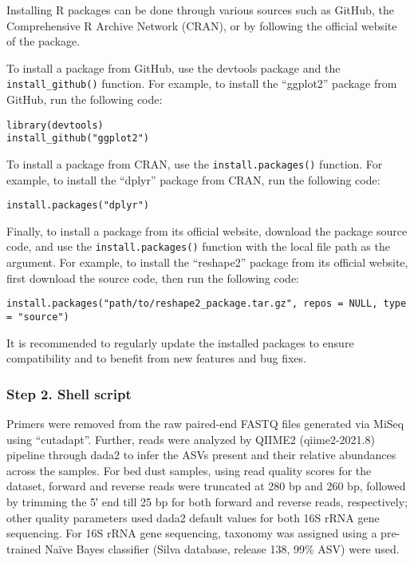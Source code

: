 \documentclass[
]{article}
\begin{document}
Installing R packages can be done through various sources such as
GitHub, the Comprehensive R Archive Network (CRAN), or by following the
official website of the package.

To install a package from GitHub, use the devtools package and the
\texttt{install\_github()} function. For example, to install the
``ggplot2'' package from GitHub, run the following code:

\begin{verbatim}
library(devtools)
install_github("ggplot2")
\end{verbatim}

To install a package from CRAN, use the \texttt{install.packages()}
function. For example, to install the ``dplyr'' package from CRAN, run
the following code:

\begin{verbatim}
install.packages("dplyr")
\end{verbatim}

Finally, to install a package from its official website, download the
package source code, and use the \texttt{install.packages()} function
with the local file path as the argument. For example, to install the
``reshape2'' package from its official website, first download the
source code, then run the following code:

\begin{verbatim}
install.packages("path/to/reshape2_package.tar.gz", repos = NULL, type = "source")
\end{verbatim}

It is recommended to regularly update the installed packages to ensure
compatibility and to benefit from new features and bug fixes.

\hypertarget{step-2.-shell-script}{%
\subsubsection{Step 2. Shell script}\label{step-2.-shell-script}}

Primers were removed from the raw paired-end FASTQ files generated via
MiSeq using ``cutadapt''. Further, reads were analyzed by QIIME2
(qiime2-2021.8) pipeline through dada2 to infer the ASVs present and
their relative abundances across the samples. For bed dust samples,
using read quality scores for the dataset, forward and reverse reads
were truncated at 280 bp and 260 bp, followed by trimming the 5′ end
till 25 bp for both forward and reverse reads, respectively; other
quality parameters used dada2 default values for both 16S rRNA gene
sequencing. For 16S rRNA gene sequencing, taxonomy was assigned using a
pre-trained Naïve Bayes classifier (Silva database, release 138, 99\%
ASV) were used.
\end{document}
